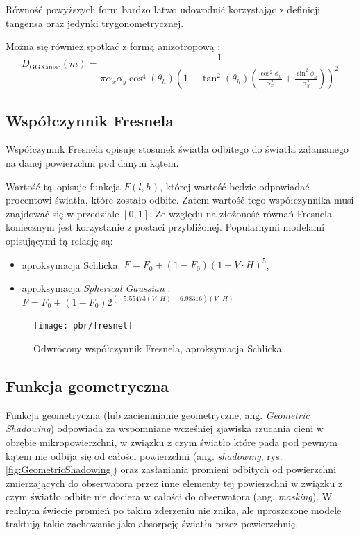 \documentclass[../main.tex]{subfiles}
\begin{document}
\noindent Równość powyższych form bardzo łatwo udowodnić korzystając z
definicji tangensa oraz jedynki trygonometrycznej.

Można się również spotkać z formą anizotropową \cite{pbrt}:
\[
  D_{\text{GGXaniso}}(m) =
    \frac{1}{
      \pi \alpha_x \alpha_y \cos^{4} (\theta_h) \left(
        1 + \tan^{2}(\theta_h) \left(
          \frac{\cos^{2}{\phi_h}}{\alpha_{x}^{2}} +
          \frac{\sin^{2}{\phi_h}}{\alpha_{y}^{2}}
        \right)
      \right)^{2}
    }
\]

\subsection{Współczynnik Fresnela}

Współczynnik Fresnela opisuje stosunek światła odbitego do światła załamanego
na danej powierzchni pod danym kątem.

Wartość tą opisuje funkcja $F(l,h)$, której wartość będzie odpowiadać
procentowi światła, które zostało odbite. Zatem wartość tego współczynnika musi
znajdować się w przedziale $[0,1]$. Ze względu na złożoność równań Fresnela
koniecznym jest korzystanie z postaci przybliżonej. Popularnymi modelami
opisującymi tą relację są:

\begin{itemize}
\item aproksymacja Schlicka: $F = F_0 + (1 - F_0)(1-V \cdot H)^5$,
\item aproksymacja \textit{Spherical Gaussian} \cite{SphericalGaussianLegarde}:
  $ F = F_0 +(1−F_0) 2^{
    \left(−5.55473\left(V \cdot H\right)−6.98316\right) (V \cdot H)
  } $
\end{itemize}

\begin{figure}[ht]
  \centering
  \texttt{[image: pbr/fresnel]}
  \caption{Odwrócony współczynnik Fresnela, aproksymacja Schlicka}
\end{figure}

\subsection{Funkcja geometryczna}

Funkcja geometryczna (lub zaciemnianie geometryczne, ang. \textit{Geometric
Shadowing}) odpowiada za wspomniane wcześniej zjawiska rzucania cieni w obrębie
mikropowierzchni, w związku z czym światło które pada pod pewnym kątem nie
odbija się od całości powierzchni (ang. \textit{shadowing}, rys.
\ref{fig:GeometricShadowing}) oraz zasłaniania promieni odbitych od powierzchni
zmierzających do obserwatora przez inne elementy tej powierzchni w związku z
czym światło odbite nie dociera w całości do obserwatora (ang.
\textit{masking}). W realnym świecie promień po takim zderzeniu nie znika, ale
uproszczone modele traktują takie zachowanie jako absorpcję światła przez
powierzchnię.
\end{document}
